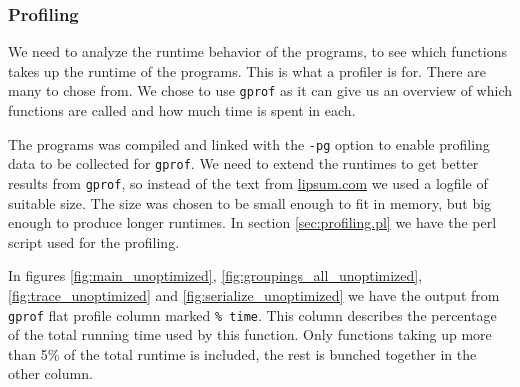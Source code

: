 \subsubsection{Profiling}
We need to analyze the runtime behavior of the programs, to see which
functions takes up the runtime of the programs. This is what a profiler
is for. There are many to chose from. We chose to use \texttt{gprof}
as it can give us an overview of which functions are called and how
much time is spent in each.

The programs was compiled and linked with the \texttt{-pg} option to
enable profiling data to be collected for \texttt{gprof}. We need to
extend the runtimes to get better results from \texttt{gprof}, so
instead of the text from \url{lipsum.com} we used a logfile of
suitable size. The size was chosen to be small enough to fit in
memory, but big enough to produce longer runtimes. In section
\vref{sec:profiling.pl} we have the perl script used for the
profiling.

In figures \ref{fig:main_unoptimized},
\ref{fig:groupings_all_unoptimized}, \ref{fig:trace_unoptimized} and
\ref{fig:serialize_unoptimized} we have the output from
\texttt{gprof} flat profile column marked \texttt{\% time}. This
column describes the percentage of the total running time used by this
function. Only functions taking up more than 5\% of the total runtime
is included, the rest is bunched together in the other column.


